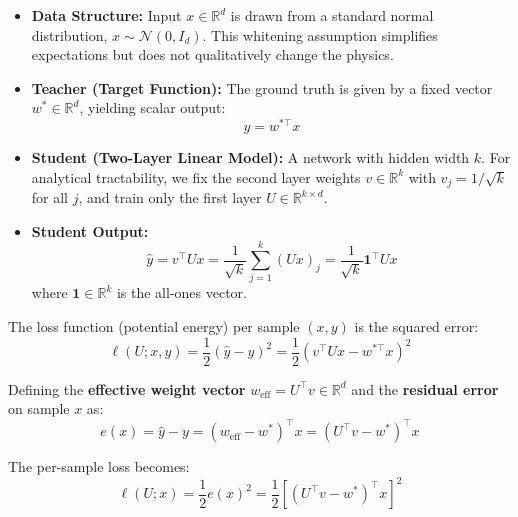 \documentclass[
  journal=largetwo,
  simfonts=false,
  year=2025,
  volume=37,
]{cup-journal}
\begin{document}
\begin{itemize}
    \item \textbf{Data Structure:} Input $x \in \mathbb{R}^d$ is drawn from a standard normal distribution, $x \sim \mathcal{N}(0, I_d)$. This whitening assumption simplifies expectations but does not qualitatively change the physics.
    
    \item \textbf{Teacher (Target Function):} The ground truth is given by a fixed vector $w^* \in \mathbb{R}^d$, yielding scalar output:
    \begin{equation}\label{eq:teacher_model}
        y = w^{*\top} x
    \end{equation}
    
    \item \textbf{Student (Two-Layer Linear Model):} A network with hidden width $k$. For analytical tractability, we fix the second layer weights $v \in \mathbb{R}^k$ with $v_j = 1/\sqrt{k}$ for all $j$, and train only the first layer $U \in \mathbb{R}^{k \times d}$.
    
    \item \textbf{Student Output:}
    \begin{equation}\label{eq:student_model}
        \hat{y} = v^\top U x = \frac{1}{\sqrt{k}} \sum_{j=1}^{k} (U x)_j = \frac{1}{\sqrt{k}} \mathbf{1}^\top U x
    \end{equation}
    where $\mathbf{1} \in \mathbb{R}^k$ is the all-ones vector.
\end{itemize}


The loss function (potential energy) per sample $(x, y)$ is the squared error:
\begin{equation}\label{eq:loss_persample}
    \ell(U; x, y) = \frac{1}{2} (\hat{y} - y)^2 = \frac{1}{2} \left( v^\top U x - w^{*\top} x \right)^2
\end{equation}

Defining the \textbf{effective weight vector} $w_{\text{eff}} = U^\top v \in \mathbb{R}^d$ and the \textbf{residual error} on sample $x$ as:
\begin{equation}
    e(x) = \hat{y} - y = (w_{\text{eff}} - w^*)^\top x = (U^\top v - w^*)^\top x
\end{equation}

The per-sample loss becomes:
\begin{equation}
    \ell(U; x) = \frac{1}{2} e(x)^2 = \frac{1}{2} \left[ (U^\top v - w^*)^\top x \right]^2
\end{equation}
\end{document}
